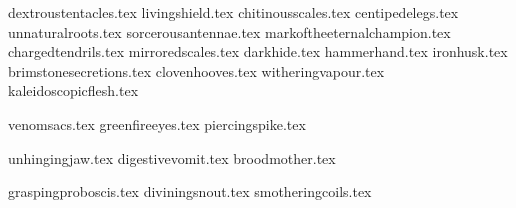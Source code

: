 

\daemonicmanifestationsintro

\raggedcolumns
\begin{multicols}{2}

\subtitle{\manifestationsoffatherchaos}
\startsortedpricelisthtgtNSP

{dextroustentacles.tex}
{livingshield.tex}
{chitinousscales.tex}
{centipedelegs.tex}
{unnaturalroots.tex}
{sorcerousantennae.tex}
{markoftheeternalchampion.tex}
{chargedtendrils.tex}
{mirroredscales.tex}
{darkhide.tex}
{hammerhand.tex}
{ironhusk.tex}
{brimstonesecretions.tex}
{clovenhooves.tex}
{witheringvapour.tex}
{kaleidoscopicflesh.tex}

\endsortedpricelisthtgtNSP

\subtitle{\manifestationsofenvy}

\startsortedpricelisthtgt

{venomsacs.tex}
{greenfireeyes.tex}
{piercingspike.tex}

\endsortedpricelisthtgt

\subtitle{\manifestationsofgluttony}
\startsortedpricelisthtgt

{unhingingjaw.tex}
{digestivevomit.tex}
{broodmother.tex}

\endsortedpricelisthtgt

\subtitle{\manifestationsofgreed}
\startsortedpricelisthtgt

{graspingproboscis.tex}
{diviningsnout.tex}
{smotheringcoils.tex}


\end{multicols}
